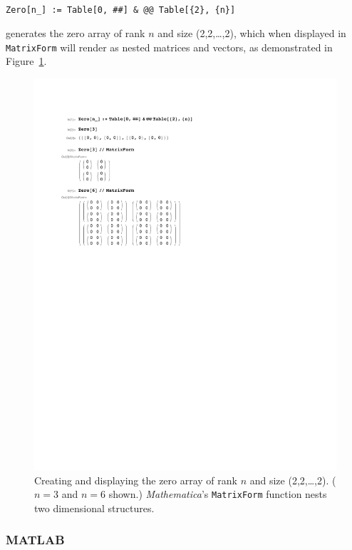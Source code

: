 \documentclass[preprint]{sigplanconf}
\newcommand{\Mathematica}{\textit{Mathematica}}
\newcommand{\code}[1]{\texttt{#1}}
\begin{document}
\begin{verbatim}

Zero[n_] := Table[0, ##] & @@ Table[{2}, {n}]

\end{verbatim}

generates the zero array of rank $n$ and size (2,2,\dots,2), which when 
displayed in \code{MatrixForm} will render as nested matrices and vectors, as 
demonstrated in Figure~\ref{fig:mathematica}.

\begin{figure}
  \centering
  \includegraphics[width=\columnwidth]{fig-mathematica/fig.pdf}
  \caption{\label{fig:mathematica} Creating and displaying the zero array of
rank $n$ and size (2,2,\dots,2). ($n=3$ and $n=6$ shown.) \Mathematica's
\code{MatrixForm} function nests two dimensional structures.}
\end{figure}

\subsubsection{MATLAB}
\end{document}
